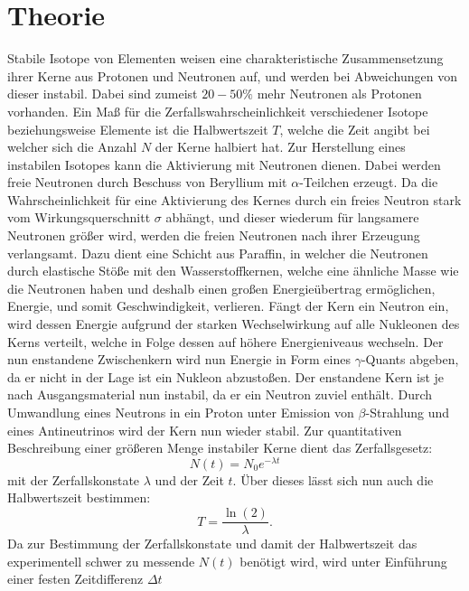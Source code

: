 \section{Theorie}
\label{sec:Theorie}
Stabile Isotope von Elementen weisen eine charakteristische Zusammensetzung ihrer Kerne aus Protonen und Neutronen auf, und werden bei Abweichungen von dieser instabil.
Dabei sind zumeist $20-50 \si{\percent}$ mehr Neutronen als Protonen vorhanden. Ein Maß für die Zerfallswahrscheinlichkeit verschiedener Isotope beziehungsweise Elemente ist
die Halbwertszeit $T$, welche die Zeit angibt bei welcher sich die Anzahl $N$ der Kerne halbiert hat. Zur Herstellung eines instabilen Isotopes kann die Aktivierung mit Neutronen
dienen. Dabei werden freie Neutronen durch Beschuss von Beryllium mit $\alpha$-Teilchen erzeugt. Da die Wahrscheinlichkeit für eine Aktivierung des Kernes durch ein freies Neutron
stark vom Wirkungsquerschnitt $\sigma$ abhängt, und dieser wiederum für langsamere Neutronen größer wird, werden die freien Neutronen nach ihrer Erzeugung verlangsamt.
Dazu dient eine Schicht aus Paraffin, in welcher die Neutronen durch elastische Stöße mit den Wasserstoffkernen, welche eine ähnliche Masse wie die Neutronen haben und deshalb
einen großen Energieübertrag ermöglichen, Energie, und somit Geschwindigkeit, verlieren.
Fängt der Kern ein Neutron ein, wird dessen Energie aufgrund der starken Wechselwirkung auf alle Nukleonen des Kerns verteilt, welche in Folge dessen auf höhere Energieniveaus wechseln.
Der nun enstandene Zwischenkern wird nun Energie in Form eines $\gamma$-Quants abgeben, da er nicht in der Lage ist ein Nukleon abzustoßen. Der enstandene Kern ist je nach
Ausgangsmaterial nun instabil, da er ein Neutron zuviel enthält. Durch Umwandlung eines Neutrons in ein Proton unter Emission von $\beta$-Strahlung und eines Antineutrinos wird der
Kern nun wieder stabil. Zur quantitativen Beschreibung einer größeren Menge instabiler Kerne dient das Zerfallsgesetz:
\begin{equation}
  N(t)= N_0 e^{- \lambda t}
  \label{eqn:Zerfallsgesetz}
\end{equation}
mit der Zerfallskonstate $\lambda$ und der Zeit $t$. Über dieses lässt sich nun auch die Halbwertszeit bestimmen:
\begin{equation}
  T=\frac{\ln(2)}{\lambda}.
  \label{eqn:Halbwertszeit}
\end{equation}
Da zur Bestimmung der Zerfallskonstate und damit der Halbwertszeit das experimentell schwer zu messende $N(t)$ benötigt wird, wird unter Einführung einer festen Zeitdifferenz $\Delta t$
